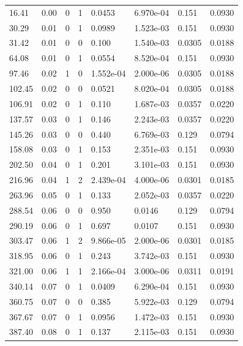 \documentclass[preview]{standalone}
\begin{document}
{{\begin{tabular}{L{1.2cm}C{1.2cm} C{0.3cm}C{0.5cm} C{1.4cm}C{1.4cm} C{1.4cm}C{1.4cm}}
  16.41  &  0.00  & 0     &  1 &  0.0453  & 6.970e-04  & 0.151 &  0.0930   \\ 
  30.29  &  0.01  & 0     &  1 &  0.0989  & 1.523e-03  & 0.151 &  0.0930   \\ 
  31.42  &  0.01  & 0     &  0 &  0.100  & 1.540e-03  & 0.0305 &  0.0188   \\ 
  64.08  &  0.01  & 0     &  1 &  0.0554  & 8.520e-04  & 0.151 &  0.0930   \\ 
  97.46  &  0.02  & 1     &  0 &  1.552e-04  & 2.000e-06  & 0.0305 &  0.0188   \\ 
  102.45  &  0.02  & 0     &  0 &  0.0521  & 8.020e-04  & 0.0305 &  0.0188   \\ 
  106.91  &  0.02  & 0     &  1 &  0.110  & 1.687e-03  & 0.0357 &  0.0220   \\ 
  137.57  &  0.03  & 0     &  1 &  0.146  & 2.243e-03  & 0.0357 &  0.0220   \\ 
  145.26  &  0.03  & 0     &  0 &  0.440  & 6.769e-03  & 0.129 &  0.0794   \\ 
  158.08  &  0.03  & 0     &  1 &  0.153  & 2.351e-03  & 0.151 &  0.0930   \\ 
  202.50  &  0.04  & 0     &  1 &  0.201  & 3.101e-03  & 0.151 &  0.0930   \\ 
  216.96  &  0.04  & 1     &  2 &  2.439e-04  & 4.000e-06  & 0.0301 &  0.0185   \\ 
  263.96  &  0.05  & 0     &  1 &  0.133  & 2.052e-03  & 0.0357 &  0.0220   \\ 
  288.54  &  0.06  & 0     &  0 &  0.950  & 0.0146  & 0.129 &  0.0794   \\ 
  290.19  &  0.06  & 0     &  1 &  0.697  & 0.0107  & 0.151 &  0.0930   \\ 
  303.47  &  0.06  & 1     &  2 &  9.866e-05  & 2.000e-06  & 0.0301 &  0.0185   \\ 
  318.95  &  0.06  & 0     &  1 &  0.243  & 3.742e-03  & 0.151 &  0.0930   \\ 
  321.00  &  0.06  & 1     &  1 &  2.166e-04  & 3.000e-06  & 0.0311 &  0.0191   \\ 
  340.14  &  0.07  & 0     &  1 &  0.0409  & 6.290e-04  & 0.151 &  0.0930   \\ 
  360.75  &  0.07  & 0     &  0 &  0.385  & 5.922e-03  & 0.129 &  0.0794   \\ 
  367.67  &  0.07  & 0     &  1 &  0.0956  & 1.472e-03  & 0.151 &  0.0930   \\ 
  387.40  &  0.08  & 0     &  1 &  0.137  & 2.115e-03  & 0.151 &  0.0930   \\ 

\end{tabular}}}
\end{document}
